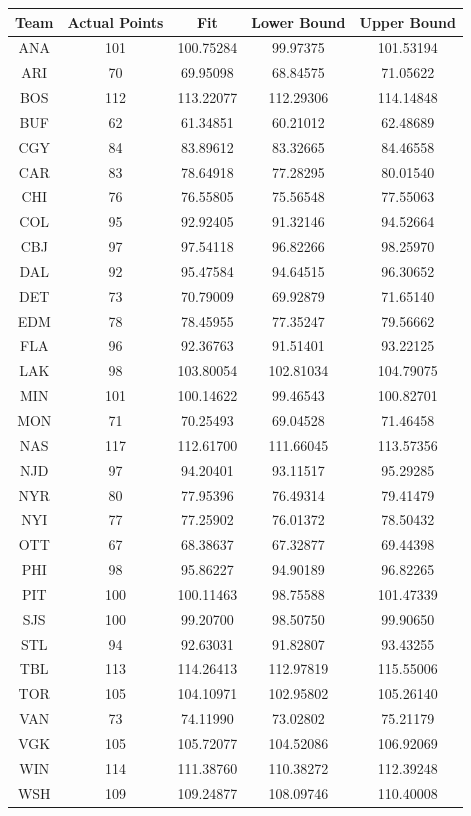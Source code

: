 	\begin{longtable}{|c|c|c|c|c|}
		\hline
		Team & Actual Points & Fit & Lower Bound & Upper Bound \\
		\hline
	ANA & 101 & 100.75284 & 99.97375 & 101.53194 \\
	ARI & 70 & 69.95098  & 68.84575 & 71.05622 \\
	BOS & 112 & 113.22077 & 112.29306 & 114.14848 \\
	BUF & 62 & 61.34851 & 60.21012 & 62.48689 \\
	CGY & 84 & 83.89612 & 83.32665 & 84.46558 \\
	CAR & 83 & 78.64918 & 77.28295 & 80.01540 \\
	CHI & 76 & 76.55805 & 75.56548 & 77.55063 \\
	COL & 95 & 92.92405 & 91.32146 & 94.52664 \\
	CBJ & 97 & 97.54118 & 96.82266 & 98.25970 \\
	DAL & 92 & 95.47584 & 94.64515 & 96.30652 \\
	DET & 73 & 70.79009 & 69.92879 & 71.65140 \\
	EDM & 78 & 78.45955 & 77.35247 & 79.56662 \\
	FLA & 96 & 92.36763 & 91.51401 & 93.22125 \\
	LAK & 98 & 103.80054 & 102.81034 & 104.79075 \\
	MIN & 101 & 100.14622 & 99.46543 & 100.82701 \\
	MON & 71 & 70.25493 & 69.04528 & 71.46458 \\
	\hline
	NAS & 117 & 112.61700 & 111.66045 & 113.57356 \\
	NJD & 97 & 94.20401 & 93.11517 & 95.29285 \\
	NYR & 80 & 77.95396 & 76.49314 & 79.41479 \\
	NYI & 77 & 77.25902 & 76.01372 & 78.50432 \\
	OTT & 67 & 68.38637 & 67.32877 & 69.44398 \\
	PHI & 98 & 95.86227 & 94.90189 & 96.82265 \\
	PIT & 100 & 100.11463 & 98.75588 & 101.47339 \\
	SJS & 100 & 99.20700 & 98.50750 & 99.90650 \\
	STL & 94 & 92.63031 & 91.82807 & 93.43255 \\
	TBL & 113 & 114.26413 & 112.97819 & 115.55006 \\
	TOR & 105 & 104.10971 & 102.95802 & 105.26140 \\
	VAN & 73 & 74.11990 & 73.02802 & 75.21179 \\
	VGK & 105 & 105.72077 & 104.52086 & 106.92069 \\
	WIN & 114 & 111.38760 & 110.38272 & 112.39248 \\
	WSH & 109 & 109.24877 & 108.09746 & 110.40008 \\
	\hline
	\end{longtable}
